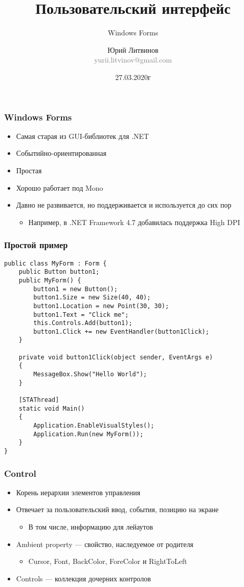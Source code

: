 \documentclass[xetex,mathserif,serif]{beamer}
\title{Пользовательский интерфейс}
\subtitle{Windows Forms}
\author[Юрий Литвинов]{Юрий Литвинов\\\small{\textcolor{gray}{yurii.litvinov@gmail.com}}}
\date{27.03.2020г}
\begin{document}
	\frame{\titlepage}

	\begin{frame}
		\frametitle{Windows Forms}
		\begin{itemize}
			\item Самая старая из GUI-библиотек для .NET
			\item Событийно-ориентированная
			\item Простая
			\item Хорошо работает под Mono
			\item Давно не развивается, но поддерживается и используется до сих пор
			\begin{itemize}
				\item Например, в .NET Framework 4.7 добавилась поддержка High DPI
			\end{itemize}
		\end{itemize}
	\end{frame}

	\begin{frame}[fragile]
		\frametitle{Простой пример}
		\begin{scriptsize}
			\begin{verbatim}
public class MyForm : Form {
    public Button button1;
    public MyForm() {
        button1 = new Button();
        button1.Size = new Size(40, 40);
        button1.Location = new Point(30, 30);
        button1.Text = "Click me";
        this.Controls.Add(button1);
        button1.Click += new EventHandler(button1Click);
    }

    private void button1Click(object sender, EventArgs e)
    {
        MessageBox.Show("Hello World");
    }

    [STAThread]
    static void Main()
    {
        Application.EnableVisualStyles();
        Application.Run(new MyForm());
    }
}
			\end{verbatim}
		\end{scriptsize}
	\end{frame}

	\begin{frame}
		\frametitle{Control}
		\begin{itemize}
			\item Корень иерархии элементов управления
			\item Отвечает за пользовательский ввод, события, позицию на экране
			\begin{itemize}
				\item В том числе, информацию для лейаутов
			\end{itemize}
			\item Ambient property --- свойство, наследуемое от родителя
			\begin{itemize}
				\item Cursor, Font, BackColor, ForeColor и RightToLeft
			\end{itemize}
			\item Controls --- коллекция дочерних контролов
		\end{itemize}
	\end{frame}
\end{document}
